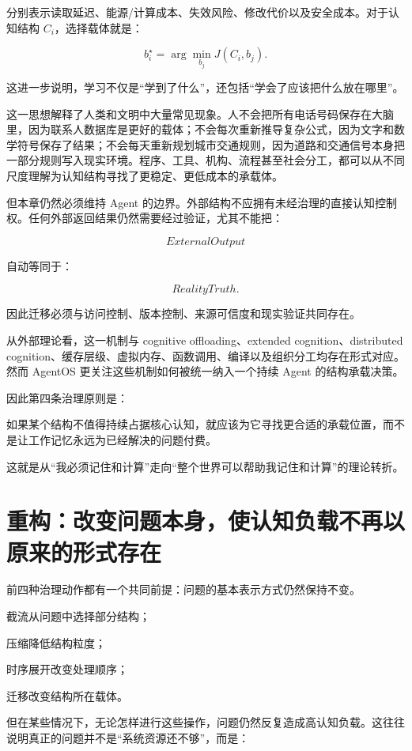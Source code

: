 分别表示读取延迟、能源/计算成本、失效风险、修改代价以及安全成本。对于认知结构 $C_i$，选择载体就是：

\[
b_i^\star
=
\arg\min_{b_j}
J(C_i,b_j).
\]

这进一步说明，学习不仅是“学到了什么”，还包括“学会了应该把什么放在哪里”。

这一思想解释了人类和文明中大量常见现象。人不会把所有电话号码保存在大脑里，因为联系人数据库是更好的载体；不会每次重新推导复杂公式，因为文字和数学符号保存了结果；不会每天重新规划城市交通规则，因为道路和交通信号本身把一部分规则写入现实环境。程序、工具、机构、流程甚至社会分工，都可以从不同尺度理解为认知结构寻找了更稳定、更低成本的承载体。

但本章仍然必须维持 Agent 的边界。外部结构不应拥有未经治理的直接认知控制权。任何外部返回结果仍然需要经过验证，尤其不能把：

\[
ExternalOutput
\]

自动等同于：

\[
RealityTruth.
\]

因此迁移必须与访问控制、版本控制、来源可信度和现实验证共同存在。

从外部理论看，这一机制与 cognitive offloading、extended cognition、distributed cognition、缓存层级、虚拟内存、函数调用、编译以及组织分工均存在形式对应。然而 AgentOS 更关注这些机制如何被统一纳入一个持续 Agent 的结构承载决策。

因此第四条治理原则是：

\begin{proposition*}
如果某个结构不值得持续占据核心认知，就应该为它寻找更合适的承载位置，而不是让工作记忆永远为已经解决的问题付费。
\end{proposition*}

这就是从“我必须记住和计算”走向“整个世界可以帮助我记住和计算”的理论转折。

\section{重构：改变问题本身，使认知负载不再以原来的形式存在}

前四种治理动作都有一个共同前提：问题的基本表示方式仍然保持不变。

截流从问题中选择部分结构；

压缩降低结构粒度；

时序展开改变处理顺序；

迁移改变结构所在载体。

但在某些情况下，无论怎样进行这些操作，问题仍然反复造成高认知负载。这往往说明真正的问题并不是“系统资源还不够”，而是：


